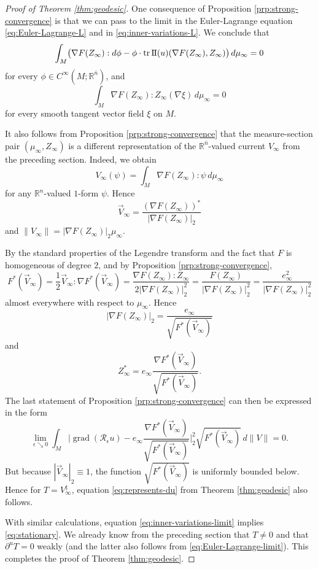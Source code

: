\documentclass[10pt,a4paper]{amsart}
\newcommand{\R}{\mathbb{R}}
\newcommand{\ndim}{{\bar{n}}}
\newcommand{\sff}{\mathrm{I{\mkern -1mu}I}}
\DeclareMathOperator{\tr}{tr}
\DeclareMathOperator{\grad}{grad}
\begin{document}
\begin{proof}[Proof of Theorem \ref{thm:geodesic}]
One consequence of Proposition \ref{prp:strong-convergence} is that we can pass to the limit
in the Euler-Lagrange equation \eqref{eq:Euler-Lagrange-L} and in \eqref{eq:inner-variations-L}. We conclude that
\begin{equation} \label{eq:Euler-Lagrange-limit}
\int_M \bigl(\nabla F(Z_\infty) : d\phi - \phi \cdot \tr \sff(u)(\nabla F(Z_\infty), Z_\infty)\bigr) \, d\mu_\infty = 0
\end{equation}
for every $\phi \in C^\infty(M; \R^\ndim)$, and
\begin{equation} \label{eq:inner-variations-limit}
\int_M \nabla F(Z_\infty) : Z_\infty(\nabla \xi) \, d\mu_\infty = 0
\end{equation}
for every smooth tangent vector field $\xi$ on $M$.

It also follows from Proposition \ref{prp:strong-convergence} that 
the measure-section pair $(\mu_\infty, Z_\infty)$ is a different representation
of the $\R^\ndim$-valued current $V_\infty$ from the preceding section.
Indeed, we obtain
\[
V_\infty(\psi) = \int_M \nabla F(Z_\infty) : \psi \, d\mu_\infty
\]
for any $\R^n$-valued $1$-form $\psi$.
Hence
\[
\vec{V}_\infty= \frac{(\nabla F(Z_\infty))^*}{|\nabla F(Z_\infty)|_2}
\] 
and $\|V_\infty\| = |\nabla F(Z_\infty)|_2 \mu_\infty$.

By the standard properties of the Legendre transform and the fact that $F$ is homogeneous of degree $2$, and by Proposition \ref{prp:strong-convergence},
\[
F^*(\vec{V}_\infty) = \frac{1}{2} \vec{V}_\infty : \nabla F^*(\vec{V}_\infty) = \frac{\nabla F(Z_\infty) : Z_\infty}{2|\nabla F(Z_\infty)|_2^2} = \frac{F(Z_\infty)}{|\nabla F(Z_\infty)|_2^2} = \frac{e_\infty^2}{|\nabla F(Z_\infty)|_2^2}
\]
almost everywhere with respect to $\mu_\infty$. Hence
\[
|\nabla F(Z_\infty)|_2 = \frac{e_\infty}{\sqrt{F^*(\vec{V}_\infty)}}
\]
and
\[
Z_\infty^* = e_\infty \frac{\nabla F^*(\vec{V}_\infty)}{\sqrt{F^*(\vec{V}_\infty)}}.
\]
The last statement of Proposition \ref{prp:strong-convergence} can then be expressed in the form
\[
\lim_{\epsilon \searrow 0} \int_M \biggl|\grad(\mathcal{R}_\epsilon u) - e_\infty \frac{\nabla F^*(\vec{V}_\infty)}{\sqrt{F^*(\vec{V}_\infty)}}\biggr|_2^2 \sqrt{F^*(\vec{V}_\infty)} \, d\|V\| = 0.
\]
But because $|\vec{V}_\infty|_2 \equiv 1$, the function $\sqrt{F^*(\vec{V}_\infty)}$ is uniformly bounded below. Hence for $T = V^\ddagger_\infty$, equation
\eqref{eq:represents-du} from
Theorem \ref{thm:geodesic} also follows.

With similar calculations, equation \eqref{eq:inner-variations-limit} implies \eqref{eq:stationary}. We already know from the preceding section that
$T \neq 0$ and that $\partial^u T = 0$ weakly (and the latter also follows from \eqref{eq:Euler-Lagrange-limit}).
This completes the proof of Theorem \ref{thm:geodesic}.
\end{proof}
\end{document}
